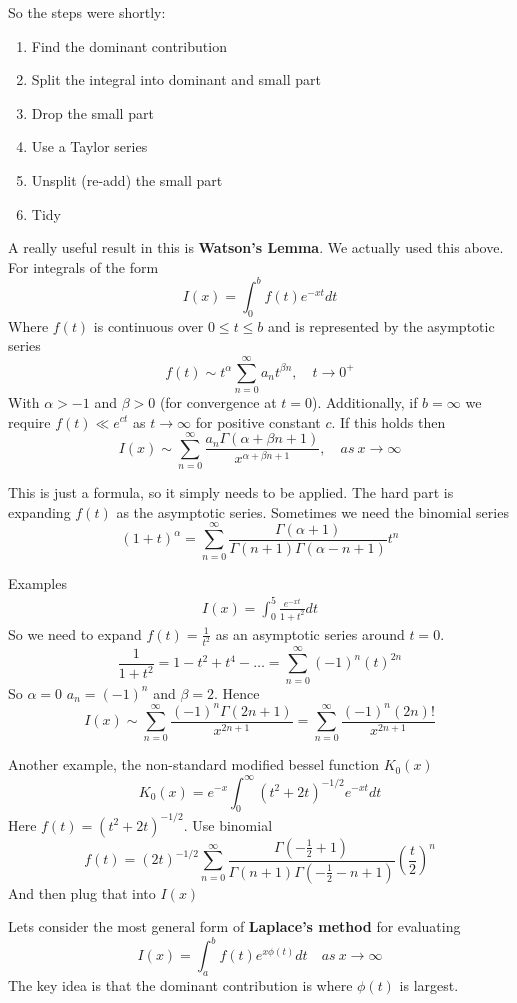 \documentclass{X:/Documents/Coding/Latex/myassignment}
\begin{document}
So the steps were shortly:
\begin{enumerate}
    \item Find the dominant contribution
    \item Split the integral into dominant and small part
    \item Drop the small part
    \item Use a Taylor series
    \item Unsplit (re-add) the small part
    \item Tidy
\end{enumerate}

A really useful result in this is \textbf{Watson's Lemma}. We actually used this above.
For integrals of the form
\[I(x) = \int_0^b f(t) e^{-xt} dt\]
Where $f(t)$ is continuous over $0\leq t \leq b$ and is represented by the asymptotic series
\[f(t) \sim t^\alpha \sum_{n=0}^\infty a_n t^{\beta n}, \quad t\to 0^+\]
With $\alpha > -1$ and $\beta > 0$ (for convergence at $t=0$). Additionally, if $b=\infty$  we require $f(t) \ll e^{ct}$ as $t\to\infty$ for positive constant $c$.
If this holds then
\[I(x) \sim \sum_{n=0}^\infty \frac{a_n\Gamma(\alpha + \beta n + 1)}{x^{\alpha + \beta n +1}}, \quad as \ x \to \infty\]


This is just a formula, so it simply needs to be applied. The hard part is expanding $f(t)$ as the asymptotic series.
Sometimes we need the binomial series
\[(1+t)^\alpha = \sum_{n=0}^\infty \frac{\Gamma(\alpha + 1)}{\Gamma(n+1) \Gamma(\alpha-n+1)} t^n\]

Examples
\begin{align*}
    I(x) = \int_0^5 \frac{e^{-xt}}{1+t^2} dt
\end{align*}
So we need to expand $f(t) = \frac{1}{t^2}$ as an asymptotic series around $t=0$.
\[\frac{1}{1+t^2} = 1 - t^2 + t^4 - \hdots = \sum_{n=0}^\infty (-1)^n(t)^{2n}\]
So $\alpha = 0$ $a_n = (-1)^n$ and $\beta = 2$. Hence
\[I(x) \sim \sum_{n=0}^\infty \frac{(-1)^n \Gamma(2n + 1)}{x^{2n+1}} = \sum_{n=0}^\infty \frac{(-1)^n (2n)!}{x^{2n+1}}\]

Another example, the non-standard modified bessel function $K_0(x)$
\[K_0(x) = e^{-x} \int_0^\infty (t^2 + 2t)^{-1/2} e^{-xt} dt\]
Here $f(t) = (t^2 + 2t)^{-1/2}$. Use binomial
\[f(t) = (2t)^{-1/2}\sum_{n=0}^\infty \frac{\Gamma(-\frac12 + 1)}{\Gamma(n+1) \Gamma(-\frac12 - n + 1)} (\frac{t}{2})^n\]
And then plug that into $I(x)$


Lets consider the most general form of \textbf{Laplace's method} for evaluating
\[I(x) = \int_a^b f(t) e^{x\phi(t)} dt\quad as \ x\to \infty\]
The key idea is that the dominant contribution is where $\phi(t)$ is largest.
\end{document}
